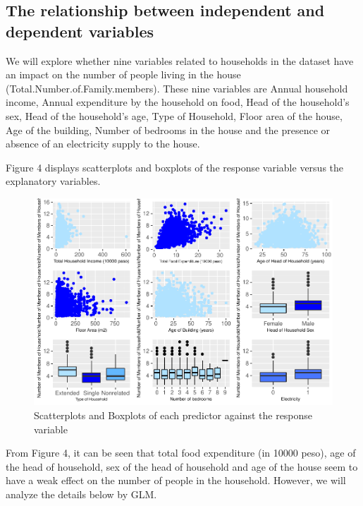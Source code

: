 \documentclass[
]{article}
\begin{document}
\hypertarget{the-relationship-between-independent-and-dependent-variables}{%
\subsection{The relationship between independent and dependent
variables}\label{the-relationship-between-independent-and-dependent-variables}}

We will explore whether nine variables related to households in the
dataset have an impact on the number of people living in the house
(Total.Number.of.Family.members). These nine variables are Annual
household income, Annual expenditure by the household on food, Head of
the household's sex, Head of the household's age, Type of Household,
Floor area of the house, Age of the building, Number of bedrooms in the
house and the presence or absence of an electricity supply to the house.

Figure 4 displays scatterplots and boxplots of the response variable
versus the explanatory variables.

\begin{figure}

{\centering \includegraphics[width=1\linewidth]{Group_01_files/figure-latex/single predictor scatterplots-1} 

}

\caption{Scatterplots and Boxplots of each predictor against the response variable}\label{fig:single predictor scatterplots}
\end{figure}

From Figure 4, it can be seen that total food expenditure (in 10000
peso), age of the head of household, sex of the head of household and
age of the house seem to have a weak effect on the number of people in
the household. However, we will analyze the details below by GLM.
\end{document}
